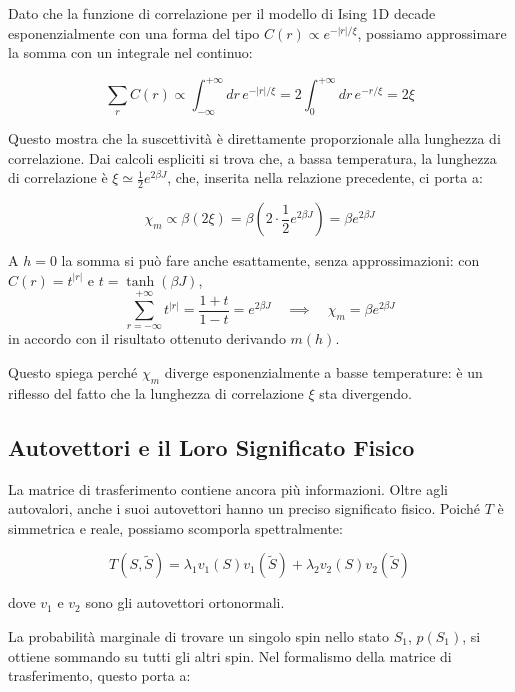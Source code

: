Dato che la funzione di correlazione per il modello di Ising 1D decade esponenzialmente con una forma del tipo $C(r) \propto e^{-|r|/\xi}$, possiamo approssimare la somma con un integrale nel continuo:

\begin{equation}
\sum_r C(r) \propto \int_{-\infty}^{+\infty} dr \, e^{-|r|/\xi} = 2 \int_{0}^{+\infty} dr \, e^{-r/\xi} = 2\xi
\end{equation}

Questo mostra che la suscettività è direttamente proporzionale alla lunghezza di correlazione. Dai calcoli espliciti si trova che, a bassa temperatura, la lunghezza di correlazione è $\xi \simeq \frac{1}{2} e^{2\beta J}$, che, inserita nella relazione precedente, ci porta a:

\begin{equation}
\chi_m \propto \beta (2\xi) = \beta \left(2 \cdot \frac{1}{2} e^{2\beta J}\right) = \beta e^{2\beta J}
\end{equation}

\noindent A $h=0$ la somma si può fare anche esattamente, senza approssimazioni: con $C(r) = t^{|r|}$ e $t = \tanh(\beta J)$,
\begin{equation}
\sum_{r=-\infty}^{+\infty} t^{|r|} = \frac{1+t}{1-t} = e^{2\beta J} \quad \implies \quad \chi_m = \beta e^{2\beta J}
\end{equation}
in accordo con il risultato ottenuto derivando $m(h)$.

Questo spiega perché $\chi_m$ diverge esponenzialmente a basse temperature: è un riflesso del fatto che la lunghezza di correlazione $\xi$ sta divergendo.


\subsection{Autovettori e il Loro Significato Fisico}

La matrice di trasferimento contiene ancora più informazioni. Oltre agli autovalori, anche i suoi autovettori hanno un preciso significato fisico. Poiché $T$ è simmetrica e reale, possiamo scomporla spettralmente:

\begin{equation}
T(S, \tilde{S}) = \lambda_1 v_1(S) v_1(\tilde{S}) + \lambda_2 v_2(S) v_2(\tilde{S})
\end{equation}

dove $v_1$ e $v_2$ sono gli autovettori ortonormali.


La probabilità marginale di trovare un singolo spin nello stato $S_1$, $p(S_1)$, si ottiene sommando su tutti gli altri spin. Nel formalismo della matrice di trasferimento, questo porta a:

